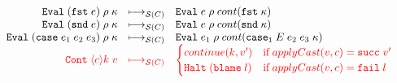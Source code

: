 \documentclass[acmsmall,review,anonymous]{acmart}\settopmatter{printfolios=true,printccs=false,printacmref=false}
\newcommand{\sOOinspect}[3]{\mathtt{Eval} \; #1 \; #2 \; #3}
\newcommand{\sOOreturn}[2]{\mathtt{Cont} \; #2 \; #1}
\newcommand{\sOOhalt}[1]{\mathtt{Halt} \; #1}
\newcommand{\eOOlam}[4]{\lambda^{#1\rightarrow{}#2}#3.#4}
\newcommand{\eOOcons}[2]{\mathtt{cons} \; #1 \; #2}
\newcommand{\eOOcar}[1]{\mathtt{fst} \; #1}
\newcommand{\eOOcdr}[1]{\mathtt{snd} \; #1}
\newcommand{\eOOcase}[3]{\mathtt{case} \; #1 \; #2 \; #3}
\newcommand{\eOOcast}[4]{#1 \langle \cOOcast{#2}{#3}{#4} \rangle}
\newcommand{\cOOcast}[3]{#1 \Rightarrow^{#2} #3}
\newcommand{\oOOblame}[1]{\mathtt{blame} \; #1}
\newcommand{\rOOsucc}[1]{\mathtt{succ}\;#1}
\newcommand{\rOOfail}[1]{\mathtt{fail}\;#1}
\newcommand{\kOOconsI}[3]{\mathtt{cons_1} \; #1 \; #2 \; #3}
\newcommand{\kOOconsII}[2]{\mathtt{cons_2} \; #1 \; #2}
\newcommand{\kOOinl}[1]{\mathtt{inl} \; #1}
\newcommand{\kOOinr}[1]{\mathtt{inr} \; #1}
\newcommand{\kOOappI}[3]{
	\mathtt{app_1} \; #1 \; #2 \; #3
}
\newcommand{\kOOappII}[2]{
	\mathtt{app_2} \; #1 \; #2}
\newcommand{\kOOcar}[1]{
	\mathtt{fst} \; #1}
\newcommand{\kOOcdr}[1]{
	\mathtt{snd} \; #1}
\newcommand{\kOOcaseI}[4]{
	\mathtt{case_1} \; #1 \; #2 \; #3 \; #4}
\newcommand{\hcvOOfun}[5]{\mathtt{fun} \; #1 \; #2 \; #3 \; #4 \; #5}
\newcommand{\hcvOOcons}[4]{\mathtt{cons}\;#1\;#2\;#3\;#4}
\newcommand{\hcvOOinl}[2]{\mathtt{inl}\;#1\;#2}
\newcommand{\hcvOOinr}[2]{\mathtt{inr}\;#1\;#2}
\newcommand{\hckOOconsI}[3]{\mathtt{cons_1}\;#1\;#2\;#3}
\newcommand{\hckOOappII}[2]{\mathtt{app_2}\;#1\;#2}
\newcommand{\sidecond}[1]{\text{if}\;#1}
\newcommand{\redrule}[3]{#1 & \longmapsto_\mathcal{C} & #2 & #3\\}
\newcommand{\redruleS}[3]{#1 & \longmapsto_{\mathcal{S}(C)} & #2 & #3\\}
\newcommand{\hiredruleS}[3]{\highlight{#1} & 
\highlight{\longmapsto_{\mathcal{S}(C)}} & \highlight{#2} & \highlight{#3} \\}
\newcommand{\highlight}[1]{{\color{red} #1}}
\begin{document}
\begin{figure}
\[\begin{array}{rclr}
	\redruleS{
		\sOOinspect{(\eOOcar{e})}{\rho}{\kappa}}{
		\sOOinspect{e}{\rho}{cont(\kOOcar{\kappa})}}{}
	
	\redruleS{
		\sOOinspect{(\eOOcdr{e})}{\rho}{\kappa}}{
		\sOOinspect{e}{\rho}{cont(\kOOcdr{\kappa})}}{}
	
	\redruleS{
		\sOOinspect{(\eOOcase{e_1}{e_2}{e_3})}{\rho}{\kappa}}{
		\sOOinspect{e_1}{\rho}{cont(\kOOcaseI{E}{e_2}{e_3}{\kappa})}}{}
	\hiredruleS{
		\sOOreturn{v}{\langle c \rangle k}
	}{
	\begin{cases}
	continue(k,v') & \sidecond{applyCast(v,c) = \rOOsucc{v'}} 
	\\
	\sOOhalt{(\oOOblame{l})} & \sidecond{applyCast(v,c) = \rOOfail{l}}
	\end{cases}
	}{}
%
%
%
%
%
%	
%		
%		
	\end{array}
	\]
	

\end{figure}
\end{document}
